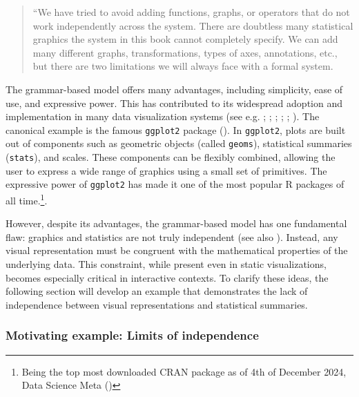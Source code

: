 \documentclass[
  openany]{book}
\theoremstyle{definition}
\theoremstyle{definition}
\theoremstyle{definition}
\theoremstyle{definition}
\theoremstyle{remark}
\begin{document}
\begin{quote}
``We have tried to avoid adding functions, graphs, or operators that do not work independently across the system. There are doubtless many statistical graphics the system in this book cannot completely specify. We can add many different graphs, transformations, types of axes, annotations, etc., but there are two limitations we will always face with a formal system.
\end{quote}

The grammar-based model offers many advantages, including simplicity, ease of use, and expressive power. This has contributed to its widespread adoption and implementation in many data visualization systems (see e.g. ; ; ; ; ; ). The canonical example is the famous \texttt{ggplot2} package (). In \texttt{ggplot2}, plots are built out of components such as geometric objects (called \texttt{geoms}), statistical summaries (\texttt{stats}), and scales. These components can be flexibly combined, allowing the user to express a wide range of graphics using a small set of primitives. The expressive power of \texttt{ggplot2} has made it one of the most popular R packages of all time.\footnote{Being the top most downloaded CRAN package as of 4th of December 2024, Data Science Meta ()}.

However, despite its advantages, the grammar-based model has one fundamental flaw: graphics and statistics are not truly independent (see also ). Instead, any visual representation must be congruent with the mathematical properties of the underlying data. This constraint, while present even in static visualizations, becomes especially critical in interactive contexts. To clarify these ideas, the following section will develop an example that demonstrates the lack of independence between visual representations and statistical summaries.

\subsubsection{Motivating example: Limits of independence}\label{stacking-not-graphical}
\end{document}
